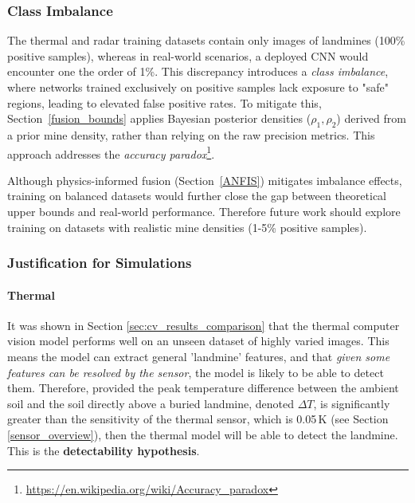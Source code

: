     \subsubsection{Class Imbalance} \label{class_imbalance}

        \noindent The thermal and radar training datasets contain only images of landmines (100\% positive samples), whereas in real-world scenarios, a deployed CNN would encounter one the order of 1\%. This discrepancy introduces a \textit{class imbalance}, where networks trained exclusively on positive samples lack exposure to "safe" regions, leading to elevated false positive rates. To mitigate this, Section~\ref{fusion_bounds} applies Bayesian posterior densities (\(\rho_1, \rho_2\)) derived from a prior mine density, rather than relying on the raw precision metrics. This approach addresses the \textit{accuracy paradox}\footnote{\url{https://en.wikipedia.org/wiki/Accuracy_paradox}}.

        \noindent Although physics-informed fusion (Section~\ref{ANFIS}) mitigates imbalance effects, training on balanced datasets would further close the gap between theoretical upper bounds and real-world performance. Therefore future work should explore training on datasets with realistic mine densities (1-5\% positive samples).

        
    \subsubsection{Justification for Simulations} \label{simulation_justification}
    
    
        \paragraph{Thermal} 
        
            
           It was shown in Section \ref{sec:cv_results_comparison} that the thermal computer vision model performs well on an unseen dataset of highly varied images. This means the model can extract general 'landmine' features, and that \textit{given some features can be resolved by the sensor}, the model is likely to be able to detect them. Therefore, provided the peak temperature difference between the ambient soil and the soil directly above a buried landmine, denoted \(\Delta T\), is significantly greater than the sensitivity of the thermal sensor, which is 0.05\,K (see Section \ref{sensor_overview}), then the thermal model will be able to detect the landmine. This is the \textbf{detectability hypothesis}.

